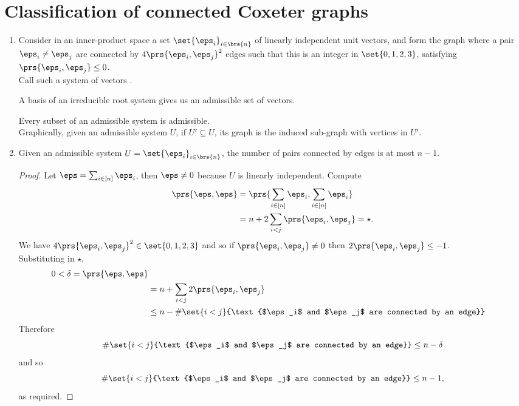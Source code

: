 \documentclass[10pt,a4paper,twoside,openany,hidelinks]{book}
\begin{document}
\section{Classification of connected Coxeter graphs}
\begin{enumerate}
\item Consider in an inner-product space a set $\set{\eps_i}_{i\in\brs{n}}$ of linearly independent unit vectors, and form the graph where a pair $\eps_i \neq \eps_j$ are connected by $4\prs{\eps_i, \eps_j}^2$ edges such that this is an integer in $\set{0,1,2,3}$, satisfying $\prs{\eps_i, \eps_j} \leq 0$.\\
Call such a system of vectors .

\begin{remark}
A basis of an irreducible root system gives us an admissible set of vectors.
\end{remark}

\begin{remark}
Every subset of an admissible system is admissible.\\
Graphically, given an admissible system $U$, if $U' \subseteq U$, its graph is the induced sub-graph with vertices in $U'$.
\end{remark}

\item
Given an admissible system $U = \set{\eps_i}_{i \in \brs{n}}$, the number of pairs connected by edges is at most $n-1$.

\begin{proof}
Let $\eps = \sum_{i \in [n]} \eps_i$, then $\eps \neq 0$ because $U$ is linearly independent. Compute
\begin{align*}
\prs{\eps,\eps} &= \prs{\sum_{i\in[n]} \eps_i,\sum_{i\in[n]} \eps_i} \\&= n+2\sum_{i<j} \prs{\eps_i, \eps_j} = \star \text{.}
\end{align*}
We have $4\prs{\eps_i, \eps_j}^2 \in \set{0,1,2,3}$ and so if $\prs{\eps_i, \eps_j} \neq 0$ then $2\prs{\eps_i,\eps_j} \leq - 1$.\\
Substituting in $\star$,
\begin{align*}
0 < \delta = \prs{\eps,\eps} \\&= n+\sum_{i < j} 2\prs{\eps_i, \eps_j} \\&\leq n - \#\set{i < j}{\text{$\eps_i$ and $\eps_j$ are connected by an edge}}
\end{align*}
Therefore \[\#\set{i < j}{\text{$\eps_i$ and $\eps_j$ are connected by an edge}} \leq n - \delta\]
and so
\[\#\set{i < j}{\text{$\eps_i$ and $\eps_j$ are connected by an edge}} \leq n-1 \text{,}\]
as required.
\end{proof}


\end{enumerate}
\end{document}
